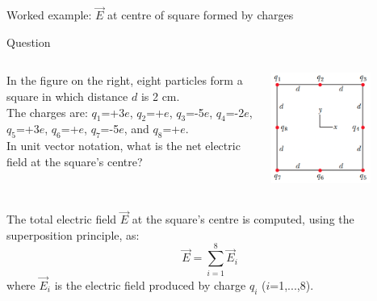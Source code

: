 {
\problemslide


\begin{frame}{Worked example: $\vec{E}$ at centre of square formed by charges}

\begin{blockexmplque}{Question}

  \begin{columns}
    \begin{column}{0.65\textwidth}
      In the figure on the right, eight particles form a square in which distance
      $d$ is 2 cm.\\
      The charges are:
      $q_1$=+3$e$, $q_2$=+$e$, $q_3$=-5$e$, $q_4$=-2$e$,
      $q_5$=+3$e$, $q_6$=+$e$, $q_7$=-5$e$, and $q_8$=+$e$.\\
      In unit vector notation, what is the net electric field at the square's centre?
    \end{column}
    \begin{column}{0.35\textwidth}
      \begin{center}
          \includegraphics[width=0.70\textwidth]{./images/problems/lect01_8_charges_on_square.png}
      \end{center}
    \end{column}
  \end{columns}
\end{blockexmplque}

The total electric field $\vec{E}$ at the square's centre is computed,
using the superposition principle, as:
\begin{equation*}
  \vec{E} = \sum_{i=1}^{8} \vec{E}_{i}
\end{equation*}
where $\vec{E}_{i}$ is the electric field produced by charge $q_i$ ($i$=1,...,8).


\end{frame}}
